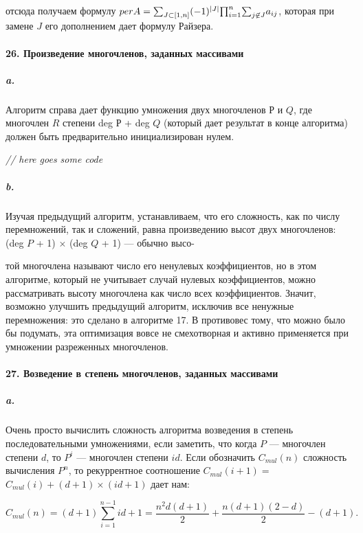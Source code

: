 \documentclass{../../template/mai_book}
\DeclarePairedDelimiter{\abs}{\lvert}{\rvert}
\begin{document}
\noindent
отсюда получаем формулу $per A = {\sum}_{J \subset [1, n]} (-1)^{\abs{J}} {\prod}_{i = 1}^n {\sum}_{j \not\in J} a_{ij}$, которая при замене $J$ его дополнением дает формулу Райзера.

\paragraph{26. Произведение многочленов, заданных массивами}

\subparagraph{a.} Алгоритм справа дает функцию умножения двух многочленов $Р$ и $Q$, где многочлен $R$ степени deg $Р$ + deg $Q$ (который дает результат в конце алгоритма) должен быть предварительно инициализирован нулем. \newline

\textit{// here goes some code}

\subparagraph{b.} Изучая предыдущий алгоритм, устанавливаем, что его сложность, как по числу перемножений, так и сложений, равна произведению высот двух многочленов: (deg $P$ + 1) $\times$ (deg $Q$ + 1) — обычно высо-

\newpage


\noindent
той многочлена называют число его ненулевых коэффициентов, но в этом алгоритме, который не учитывает случай нулевых коэффициентов, можно рассматривать высоту многочлена как число всех коэффициентов. Значит, возможно улучшить предыдущий алгоритм, исключив все ненужные перемножения: это сделано в алгоритме 17. В противовес тому, что можно было бы подумать, эта оптимизация вовсе не смехотворная и активно применяется при умножении разреженных многочленов.

\paragraph{27. Возведение в степень многочленов, заданных массивами}

\subparagraph{a.} Очень просто вычислить сложность алгоритма возведения в степень последовательными умножениями, если заметить, что когда $P$ — многочлен степени $d$, то $P^i$ — многочлен степени $id$. Если обозначить $C_{mul}(n)$ сложность вычисления $P^n$, то рекуррентное соотношение $C_{mul}(i + 1) =$ \linebreak $C_{mul}(i) + (d + 1) \times (id + 1)$ дает нам:

\begin{equation*}
C_{mul}(n) = (d + 1) \sum_{i = 1}^{n - 1} id + 1 = \frac{n^2 d(d + 1)}{2} + \frac{n(d + 1)(2 - d)}{2} - (d + 1).
\end{equation*}
\end{document}
